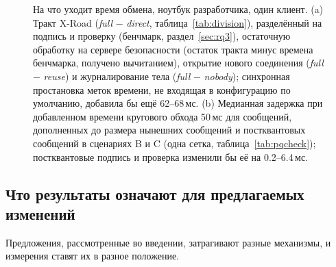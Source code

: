 \documentclass[conference,a4paper]{IEEEtran}
\newcommand{\newtext}[1]{{\color{blue}#1}}
\newcommand{\newred}[1]{{\color{red}#1}}
\begin{document}
\begin{figure}[!tb]
\caption{\newtext{На что уходит время обмена, ноутбук разработчика, один клиент. (a) Тракт X-Road
(\emph{full} $-$ \emph{direct}, таблица~\ref{tab:division}), разделённый на подпись и проверку
(бенчмарк, раздел~\ref{sec:rq3}), \newred{остаточную обработку на сервере безопасности (остаток тракта минус времена бенчмарка, получено вычитанием)}, открытие нового соединения (\emph{full} $-$ \emph{reuse}) и журналирование тела
(\emph{full} $-$ \emph{nobody}); синхронная простановка меток времени, не входящая в конфигурацию по умолчанию, добавила бы ещё
62--68\,мс. (b) Медианная задержка при добавленном времени кругового обхода 50\,мс для сообщений, дополненных до размера
нынешних сообщений и постквантовых сообщений в сценариях B и C (одна сетка,
таблица~\ref{tab:pqcheck}); постквантовые подпись и проверка изменили бы её на 0.2--6.4\,мс.}}
\label{fig:summary}
\end{figure}

\subsection{Что результаты означают для предлагаемых изменений}\label{sec:pq}

Предложения, рассмотренные во введении, затрагивают разные механизмы, и измерения ставят
их в разное положение.
\end{document}
